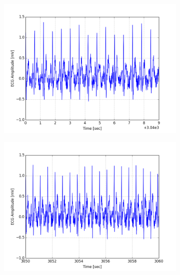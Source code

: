 \documentclass[paper=a4, fontsize=11pt]{scrartcl}
\numberwithin{equation}{section}		%
\numberwithin{figure}{section}			%
\numberwithin{table}{section}		    %
\begin{document}
\begin{appendices}
\begin{figure}[H]
	\centering
	\begin{subfigure}[b]{0.3\textwidth}
		\includegraphics[width=\textwidth]{sim/ecg_58}
	\end{subfigure}
	\begin{subfigure}[b]{0.3\textwidth}
		\includegraphics[width=\textwidth]{sim/ecg_59}
	\end{subfigure}
	\begin{subfigure}[b]{0.3\textwidth}

\end{subfigure}
\end{figure}
\end{appendices}
\end{document}

